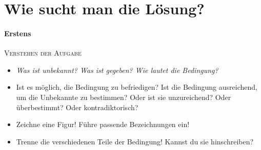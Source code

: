\documentclass
[
  fontsize = 11pt,
  parskip  = half-,
  BCOR     = 0pt,
  DIV      = 11,
  draft,
  ngerman
]
{scrartcl}
\begin{document}

\small

\section*{Wie sucht man die Lösung?}

\paragraph{Erstens}\textsc{Verstehen der Aufgabe}
\begin{itemize}
  \renewcommand{\itemsep}{-0.5ex}
  \item \textit{Was ist unbekannt? Was ist gegeben? Wie lautet die Bedingung?}
  \item Ist es möglich, die Bedingung zu befriedigen? Ist die Bedingung ausreichend,
        um die Unbekannte zu bestimmen? Oder ist sie unzureichend? Oder überbestimmt?
        Oder kontradiktorisch?
  \item Zeichne eine Figur! Führe passende Bezeichnungen ein!
  \item Trenne die verschiedenen Teile der Bedingung! Kannst du sie hinschreiben?
\end{itemize}

\end{document}
